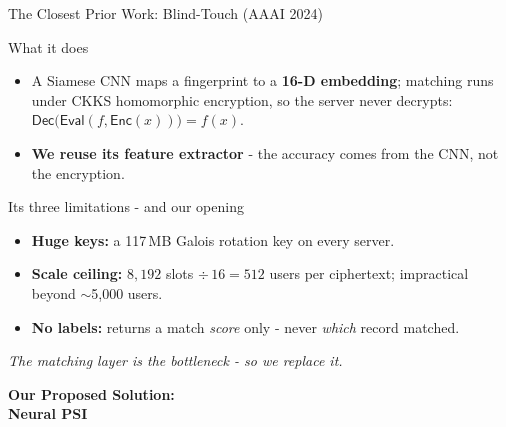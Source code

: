 \documentclass{beamer}
\begin{document}
\begin{frame}{The Closest Prior Work: Blind-Touch (AAAI 2024)}
  \begin{block}{What it does}
    \begin{itemize}
      \item A Siamese CNN maps a fingerprint to a \textbf{16-D embedding}; matching runs under CKKS homomorphic encryption, so the server never decrypts:
      $\textsf{Dec}\big(\textsf{Eval}(f,\textsf{Enc}(x))\big) = f(x)$.
      \item \textbf{We reuse its feature extractor} - the accuracy comes from the CNN, not the encryption.
    \end{itemize}
  \end{block}

  \begin{block}{Its three limitations - and our opening}
    \begin{itemize}
      \item \textbf{Huge keys:} a 117\,MB Galois rotation key on every server.
      \item \textbf{Scale ceiling:} $8{,}192$ slots $\div\,16 = 512$ users per ciphertext; impractical beyond \alert{$\sim$5{,}000 users}.
      \item \textbf{No labels:} returns a match \emph{score} only - never \emph{which} record matched.
    \end{itemize}
  \end{block}
  \centering
  \emph{The matching layer is the bottleneck - so we replace it.}
\end{frame}

\begin{frame}
  \centering
  \vspace{2cm}
  {\Huge \textbf{Our Proposed Solution:}} \\[0.6em]
  {\Huge \textbf{\alert{Neural PSI}}}
\end{frame}
\end{document}
